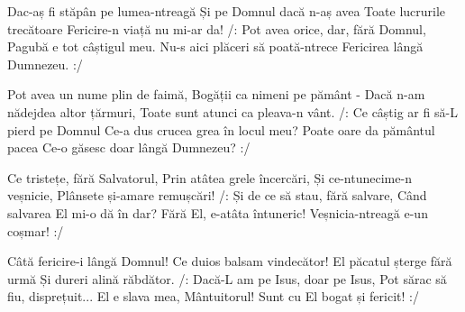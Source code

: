 
\beginverse
Dac-aș fi stăpân pe lumea-ntreagă
Și pe Domnul dacă n-aș avea
Toate lucrurile trecătoare
Fericire-n viață nu mi-ar da!
/: Pot avea orice, dar, fără Domnul,
Pagubă e tot câștigul meu.
Nu-s aici plăceri să poată-ntrece
Fericirea lângă Dumnezeu. :/
\endverse

\beginverse
Pot avea un nume plin de faimă,
Bogății ca nimeni pe pământ -
Dacă n-am nădejdea altor țărmuri,
Toate sunt atunci ca pleava-n vânt.
/: Ce câștig ar fi să-L pierd pe Domnul
Ce-a dus crucea grea în locul meu?
Poate oare da pământul pacea
Ce-o găsesc doar lângă Dumnezeu? :/
\endverse

\beginverse
Ce tristețe, fără Salvatorul,
Prin atâtea grele încercări,
Și ce-ntunecime-n veșnicie,
Plânsete și-amare remușcări!
/: Și de ce să stau, fără salvare,
Când salvarea El mi-o dă în dar?
Fără El, e-atâta întuneric!
Veșnicia-ntreagă e-un coșmar! :/
\endverse

\beginverse
Câtă fericire-i lângă Domnul!
Ce duios balsam vindecător!
El păcatul șterge fără urmă
Și dureri alină răbdător.
/: Dacă-L am pe Isus, doar pe Isus,
Pot sărac să fiu, disprețuit...
El e slava mea, Mântuitorul!
Sunt cu El bogat și fericit! :/
\endverse

\endsong
